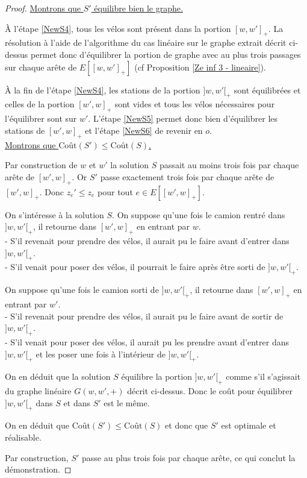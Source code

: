 \begin{proof}
\uline{Montrons que $S'$ équilibre bien le graphe.}

\`A l'étape \ref{NewS4}, tous les vélos sont présent dans la portion $[w,w']_+$. La résolution à l'aide de l'algorithme du cas linéaire sur le graphe extrait décrit ci-dessus permet donc d'équilibrer la portion de graphe avec au plus trois passages sur chaque arête de $E\left[[w,w']_+\right]$ (cf Proposition \ref{Ze inf 3 - lineaire}).

\`A la fin de l'étape \ref{NewS4}, les stations de la portion $]w,w'[_+$ sont équilibrées et celles de la portion $[w',w]_+$ sont vides et tous les vélos nécessaires pour l'équilibrer sont sur $w'$. L'étape \ref{NewS5} permet donc bien d'équilibrer les stations de $[w',w]_+$ et l'étape \ref{NewS6} de revenir en $o$.
\\

\uline{Montrons que $\mbox{Coût}(S') \le \mbox{Coût}(S)$.}

Par construction de $w$ et $w'$ la solution $S$ passait au moins trois fois par chaque arête de $[w',w]_+$. Or $S'$ passe exactement trois fois par chaque arête de $[w',w]_+$. Donc $z_e' \le z_e$ pour tout $e \in E\left[ \left[w',w\right]_+\right]$.

On s'intéresse à la solution $S$. On suppose qu'une fois le camion rentré dans $]w,w'[_+$, il retourne dans $[w',w]_+$ en entrant par $w$.\\
- S'il revenait pour prendre des vélos, il aurait pu le faire avant d'entrer dans $]w,w'[_+$.\\
- S'il venait pour poser des vélos, il pourrait le faire après être sorti de $]w,w'[_+$.

On suppose qu'une fois le camion sorti de $]w,w'[_+$, il retourne dans $[w',w]_+$ en entrant par $w'$.\\
- S'il revenait pour prendre des vélos, il aurait pu le faire avant de sortir de $]w,w'[_+$.\\
- S'il venait pour poser des vélos, il aurait pu les prendre avant d'entrer dans $]w,w'[_+$ et les poser une fois à l'intérieur de $]w,w'[_+$.

On en déduit que la solution $S$ équilibre la portion $]w,w'[_+$ comme s'il s'agissait du graphe linéaire $G(w,w',+)$ décrit ci-dessus.
Donc le coût pour équilibrer $]w,w'[_+$ dans $S$ et dans $S'$ est le même.

On en déduit que $\mbox{Coût}(S') \le \mbox{Coût}(S)$ et donc que $S'$ est optimale et réalisable.

Par construction, $S'$ passe au plus trois fois par chaque arête, ce qui conclut la démonstration.
\end{proof}

